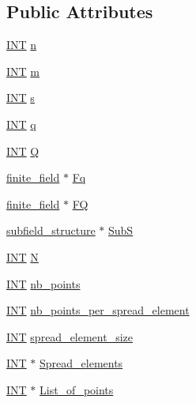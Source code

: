 \subsection*{Public Attributes}
\begin{DoxyCompactItemize}
\item 
\mbox{\hyperlink{galois_8h_a09fddde158a3a20bd2dcadb609de11dc}{I\+NT}} \mbox{\hyperlink{classdesarguesian__spread_a4a9fd5642b270a866775d8c370491a29}{n}}
\item 
\mbox{\hyperlink{galois_8h_a09fddde158a3a20bd2dcadb609de11dc}{I\+NT}} \mbox{\hyperlink{classdesarguesian__spread_a447549ee12cd9e852d5ac14a1c4937a1}{m}}
\item 
\mbox{\hyperlink{galois_8h_a09fddde158a3a20bd2dcadb609de11dc}{I\+NT}} \mbox{\hyperlink{classdesarguesian__spread_ad0a57698b2975f3a15538eb572127b43}{s}}
\item 
\mbox{\hyperlink{galois_8h_a09fddde158a3a20bd2dcadb609de11dc}{I\+NT}} \mbox{\hyperlink{classdesarguesian__spread_a8291f5fc3f2208810855534423132228}{q}}
\item 
\mbox{\hyperlink{galois_8h_a09fddde158a3a20bd2dcadb609de11dc}{I\+NT}} \mbox{\hyperlink{classdesarguesian__spread_a5d3236909075e1c91b057ad1e076d62c}{Q}}
\item 
\mbox{\hyperlink{classfinite__field}{finite\+\_\+field}} $\ast$ \mbox{\hyperlink{classdesarguesian__spread_a25013eacbdad583219b7e1ab83870c06}{Fq}}
\item 
\mbox{\hyperlink{classfinite__field}{finite\+\_\+field}} $\ast$ \mbox{\hyperlink{classdesarguesian__spread_a245dfb3599bb1931d09f85275e1a7c71}{FQ}}
\item 
\mbox{\hyperlink{classsubfield__structure}{subfield\+\_\+structure}} $\ast$ \mbox{\hyperlink{classdesarguesian__spread_a37ff42bc23a84c3134679820f6956cae}{SubS}}
\item 
\mbox{\hyperlink{galois_8h_a09fddde158a3a20bd2dcadb609de11dc}{I\+NT}} \mbox{\hyperlink{classdesarguesian__spread_aa27f1c029037c2c8c434f9d2eb31e14e}{N}}
\item 
\mbox{\hyperlink{galois_8h_a09fddde158a3a20bd2dcadb609de11dc}{I\+NT}} \mbox{\hyperlink{classdesarguesian__spread_a32bf5b512352a8e344400bc95f723977}{nb\+\_\+points}}
\item 
\mbox{\hyperlink{galois_8h_a09fddde158a3a20bd2dcadb609de11dc}{I\+NT}} \mbox{\hyperlink{classdesarguesian__spread_abac2dd88705f11a9c2df0680221d4808}{nb\+\_\+points\+\_\+per\+\_\+spread\+\_\+element}}
\item 
\mbox{\hyperlink{galois_8h_a09fddde158a3a20bd2dcadb609de11dc}{I\+NT}} \mbox{\hyperlink{classdesarguesian__spread_a745b723f444092072d55c5263973a583}{spread\+\_\+element\+\_\+size}}
\item 
\mbox{\hyperlink{galois_8h_a09fddde158a3a20bd2dcadb609de11dc}{I\+NT}} $\ast$ \mbox{\hyperlink{classdesarguesian__spread_a1a5d103df69f5a03c376ba45792db59f}{Spread\+\_\+elements}}
\item 
\mbox{\hyperlink{galois_8h_a09fddde158a3a20bd2dcadb609de11dc}{I\+NT}} $\ast$ \mbox{\hyperlink{classdesarguesian__spread_ace803e92bc21ad3eb119bf8c83b9496a}{List\+\_\+of\+\_\+points}}
\end{DoxyCompactItemize}


